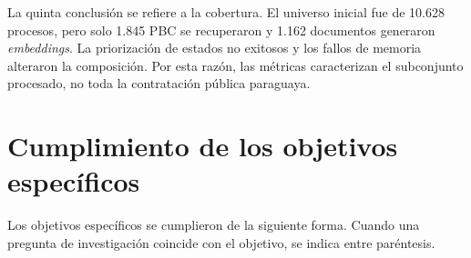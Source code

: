 La quinta conclusión se refiere a la cobertura. El universo inicial fue de 10.628 procesos, pero solo 1.845 PBC se recuperaron y 1.162 documentos generaron \textit{embeddings}. La priorización de estados no exitosos y los fallos de memoria alteraron la composición. Por esta razón, las métricas caracterizan el subconjunto procesado, no toda la contratación pública paraguaya.





\section{Cumplimiento de los objetivos específicos}

Los objetivos específicos se cumplieron de la siguiente forma. Cuando una pregunta de investigación coincide con el objetivo, se indica entre paréntesis.

